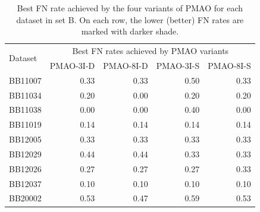\begin{table}[!htbp]
\centering
\scriptsize
\caption{Best FN rate achieved by the four variants of PMAO for each dataset in set B. On each row, the lower (better) FN rates are marked with darker shade.}
	\begin{tabular}{|l|r|r|r|r|}
		\hline
		\multirow{2}{*}{Dataset} & \multicolumn{4}{c|}{Best FN rates achieved by PMAO variants} \\
		\cline{2-5}          & \multicolumn{1}{l|}{PMAO-3I-D} & \multicolumn{1}{l|}{PMAO-8I-D} & \multicolumn{1}{l|}{PMAO-3I-S} & \multicolumn{1}{l|}{PMAO-8I-S} \\
		\hline
		BB11007 & \cellcolor[rgb]{ .384,  .745,  .478}0.33 & \cellcolor[rgb]{ .384,  .745,  .478}0.33 & \cellcolor[rgb]{ .988,  1,  .992}0.50 & \cellcolor[rgb]{ .384,  .745,  .478}0.33 \\
		\hline
		BB11034 & \cellcolor[rgb]{ .988,  1,  .992}0.20 & \cellcolor[rgb]{ .384,  .745,  .478}0.00 & \cellcolor[rgb]{ .988,  1,  .992}0.20 & \cellcolor[rgb]{ .988,  1,  .992}0.20 \\
		\hline
		BB11038 & \cellcolor[rgb]{ .384,  .745,  .478}0.00 & \cellcolor[rgb]{ .384,  .745,  .478}0.00 & \cellcolor[rgb]{ .988,  1,  .992}0.40 & \cellcolor[rgb]{ .384,  .745,  .478}0.00 \\
		\hline
		BB11019 & \cellcolor[rgb]{ .988,  1,  .992}0.14 & \cellcolor[rgb]{ .988,  1,  .992}0.14 & \cellcolor[rgb]{ .988,  1,  .992}0.14 & \cellcolor[rgb]{ .988,  1,  .992}0.14 \\
		\hline
		BB12005 & \cellcolor[rgb]{ .988,  1,  .992}0.33 & \cellcolor[rgb]{ .988,  1,  .992}0.33 & \cellcolor[rgb]{ .988,  1,  .992}0.33 & \cellcolor[rgb]{ .988,  1,  .992}0.33 \\
		\hline
		BB12029 & \cellcolor[rgb]{ .988,  1,  .992}0.44 & \cellcolor[rgb]{ .988,  1,  .992}0.44 & \cellcolor[rgb]{ .384,  .745,  .478}0.33 & \cellcolor[rgb]{ .384,  .745,  .478}0.33 \\
		\hline
		BB12026 & \cellcolor[rgb]{ .384,  .745,  .478}0.27 & \cellcolor[rgb]{ .384,  .745,  .478}0.27 & \cellcolor[rgb]{ .384,  .745,  .478}0.27 & \cellcolor[rgb]{ .988,  1,  .992}0.33 \\
		\hline
		BB12037 & \cellcolor[rgb]{ .988,  1,  .992}0.10 & \cellcolor[rgb]{ .988,  1,  .992}0.10 & \cellcolor[rgb]{ .988,  1,  .992}0.10 & \cellcolor[rgb]{ .988,  1,  .992}0.10 \\
		\hline
		BB20002 & \cellcolor[rgb]{ .686,  .871,  .733}0.53 & \cellcolor[rgb]{ .384,  .745,  .478}0.47 & \cellcolor[rgb]{ .988,  1,  .992}0.59 & \cellcolor[rgb]{ .686,  .871,  .733}0.53 \\

\end{tabular}
\end{table}
